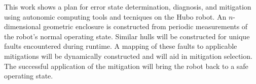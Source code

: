This work shows a plan for error state determination, diagnosis, and mitigation using autonomic computing tools and tecniques on the Hubo robot. An $n$-dimensional geometric enclosure is constructed from periodic measurements of the robot's normal operating state. Similar hulls will be constructed for unique faults encountered during runtime. A mapping of these faults to applicable mitigations will be dynamically constructed and will aid in mitigation selection. The successful application of the mitigation will bring the robot back to a safe operating state.